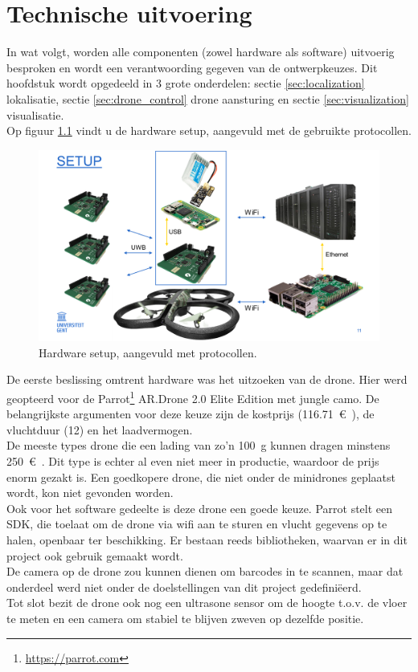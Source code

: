 \chapter{Technische uitvoering}
In wat volgt, worden alle componenten (zowel hardware als software) uitvoerig besproken en wordt een verantwoording gegeven van de ontwerpkeuzes.
Dit hoofdstuk wordt opgedeeld in 3 grote onderdelen: sectie \ref{sec:localization} lokalisatie, sectie \ref{sec:drone_control} drone aansturing en sectie \ref{sec:visualization} visualisatie.\\

Op figuur \ref{fig:setup} vindt u de hardware setup, aangevuld met de gebruikte protocollen.\\
\begin{figure}[p]
	\centering
	\includegraphics[width=\textwidth]{Setup}
	\caption[Setup]{Hardware setup, aangevuld met protocollen.}
	\label{fig:setup}
\end{figure}

De eerste beslissing omtrent hardware was het uitzoeken van de drone.
Hier werd geopteerd voor de Parrot\footnote{\url{https://parrot.com}} AR.Drone 2.0 Elite Edition met jungle camo.
De belangrijkste argumenten voor deze keuze zijn de kostprijs (\SI{116.71}{\euro{}}), de vluchtduur (\SI{12}{\min}) en het laadvermogen.\\
De meeste types drone die een lading van zo'n \SI{100}{\g} kunnen dragen minstens \SI{250}{\euro{}}.
Dit type is echter al even niet meer in productie, waardoor de prijs enorm gezakt is.
Een goedkopere drone, die niet onder de minidrones geplaatst wordt, kon niet gevonden worden.\\
Ook voor het software gedeelte is deze drone een goede keuze. Parrot stelt een SDK, die toelaat om de drone via wifi aan te sturen en vlucht gegevens op te halen, openbaar ter beschikking.
Er bestaan reeds bibliotheken, waarvan er in dit project ook gebruik gemaakt wordt.\\
De camera op de drone zou kunnen dienen om barcodes in te scannen, maar dat onderdeel werd niet onder de doelstellingen van dit project gedefiniëerd.\\
Tot slot bezit de drone ook nog een ultrasone sensor om de hoogte t.o.v. de vloer te meten en een camera om stabiel te blijven zweven op dezelfde positie.\\

